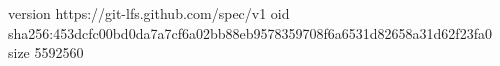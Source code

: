 version https://git-lfs.github.com/spec/v1
oid sha256:453dcfc00bd0da7a7cf6a02bb88eb9578359708f6a6531d82658a31d62f23fa0
size 5592560
